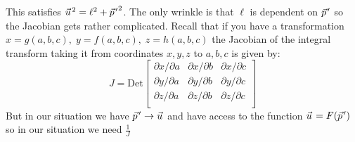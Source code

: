 \documentclass[11pt]{article}
\newcommand{\vectorwithspace}[1]{\vec{#1}\mkern2mu\vphantom{#1}}
\newcommand{\pv}{\vectorwithspace{p}}
\newcommand{\uv}{\vectorwithspace{u}}
\newcommand{\ppv}{{\pv'}}
\newcommand{\p}{\partial}
\begin{document}
This satisfies $\uv^2=\ell^2+\ppv^2$. The only wrinkle is that $\ell$ is dependent on $\ppv$ so the Jacobian gets rather complicated.
Recall that if you have a transformation $x=g(a,b,c),\;y=f(a,b,c),\;z=h(a,b,c)$ the Jacobian of the integral transform taking it from coordinates $x,y,z$ to $a,b,c$ is given by:
\begin{equation}
	J=\mathrm{Det}\left[
		\begin{array}{lll}
			\p x/\p a & \p x/\p b & \p x/\p c \\
			\p y/\p a & \p y/\p b & \p y/\p c \\
			\p z/\p a & \p z/\p b & \p z/\p c \\
		\end{array}
		\right]
\end{equation}
But in our situation we have $\ppv \to \uv$ and have access to the function $\uv=F(\ppv)$ so in our situation we need $\frac{1}{J} $
\end{document}

